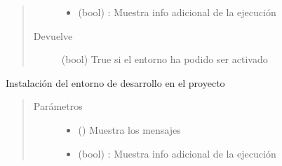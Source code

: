 \documentclass[a4paper,12pt,spanish]{sphinxmanual}
\begin{document}
\begin{fulllineitems}
\begin{fulllineitems}
\begin{quote}
\begin{description}
\begin{itemize}
\item {} 
 \textendash{} (bool)   : Muestra info adicional de la ejecución

\end{itemize}

\item[{Devuelve}] \leavevmode
(bool) True si el entorno ha podido ser activado

\end{description}\end{quote}

\end{fulllineitems}


\begin{fulllineitems}
\label{\detokenize{make:make.MyMake.clean}}
\end{fulllineitems}


\begin{fulllineitems}
\label{\detokenize{make:make.MyMake.dev_install}}
Instalación del entorno de desarrollo en el proyecto
\begin{quote}\begin{description}
\item[{Parámetros}] \leavevmode\begin{itemize}
\item {} 
 () \textendash{} Muestra los mensajes

\item {} 
 \textendash{} (bool)   : Muestra info adicional de la ejecución

\end{itemize}

\end{description}\end{quote}

\end{fulllineitems}


\end{fulllineitems}
\end{document}
